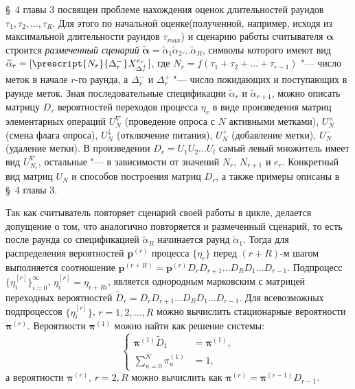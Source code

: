 \S~4 главы 3 посвящен проблеме нахождения оценок длительностей раундов $\tau_1, \tau_2, \dots, \tau_R$. Для этого по начальной оценке(полученной, например, исходя из максимальной длительности раундов $\tau_{max}$) и сценарию работы считывателя $\bm{\alpha}$ строится \textit{размеченный сценарий} $\widetilde{\bm{\alpha}} = \widetilde{\alpha}_1 \widetilde{\alpha}_2 \dots \widetilde{\alpha}_R$, символы которого имеют вид $\widetilde{\alpha}_r = [\prescript{N_r}{\Delta_r^-} X^{e_r}_{\Delta_r^+}]$, где $N_r = f(\tau_1 + \tau_2 + \dots + \tau_{r-1})$ "--- число меток в начале $r$-го раунда, а $\Delta_r^-$ и $\Delta_r^+$ "--- число покидающих и поступающих в раунде меток. Зная последовательные спецификации $\widetilde{\alpha}_{r}$ и $\widetilde{\alpha}_{r+1}$, можно описать матрицу $D_r$ вероятностей переходов процесса $\eta_r$ в виде произведения матриц элементарных операций $U_N^\nabla$ (проведение опроса с $N$ активными метками), $U_N^\times$ (смена флага опроса), $U_N^\downarrow$ (отключение питания), $U_N^+$ (добавление метки), $U_N^-$ (удаление метки). В произведении $D_r = U_1 U_2 \dots U_l$ самый левый множитель имеет вид $U_{N_r}^\nabla$, остальные "--- в зависимости от значений $N_r$, $N_{r+1}$ и $e_r$. Конкретный вид матриц $U_N$ и способов построения матриц $D_r$, а также примеры описаны в \S~4 главы 3.

Так как считыватель повторяет сценарий своей работы в цикле, делается допущение о том, что аналогично повторяется и размеченный сценарий, то есть после раунда со спецификацией $\widetilde{\alpha}_{R}$ начинается раунд $\widetilde{\alpha}_1$. Тогда для распределения вероятностей $\bm{p}^{(r)}$ процесса $\{ \eta_r \}$ перед $(r + R)$-м шагом выполняется соотношение $\bm{p}^{(r+R)} = \bm{p}^{(r)} D_r D_{r+1} \dots D_R D_1 \dots D_{r-1}$. Подпроцесс $\{ \eta_i^{[r]} \}_{i=0}^\infty$, $\eta_i^{[r]} = \eta_{r+Ri}$, является однородным марковским с матрицей переходных вероятностей $\widetilde{D}_r = D_r D_{r+1} \dots D_R D_1 \dots D_{r-1}$. Для всевозможных подпроцессов $\{ \eta_i^{[r]} \}$, $r = 1, 2, \dots, R$ можно вычислить стационарные вероятности $\bm{\pi}^{(r)}$. Вероятности $\bm{\pi}^{(1)}$ можно найти как решение системы:
\begin{equation*}
	\begin{cases}
		\bm{\pi}^{(1)} \widetilde{D}_1 &= \bm{\pi}^{(1)},\\
		\sum\limits_{n=0}^{\overline{N}} \pi^{(1)}_n &= 1,
	\end{cases}
\end{equation*}
а вероятности $\bm{\pi}^{(r)}$, $r = \overline{2, R}$ можно вычислить как $\bm{\pi}^{(r)} = \bm{\pi}^{(r-1)} D_{r-1}$.

